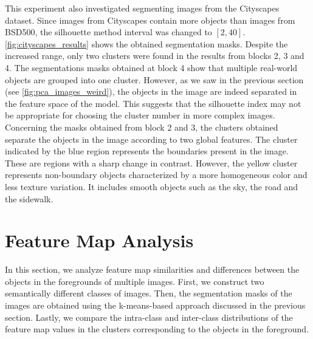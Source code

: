 This experiment also investigated segmenting images from the Cityscapes dataset. Since images from Cityscapes contain more objects than images from BSD500, the silhouette method interval was changed to $[2, 40]$. \autoref{fig:cityscapes_results} shows the obtained segmentation masks. Despite the increased range, only two clusters were found in the results from blocks 2, 3 and 4. The segmentations masks obtained at block 4 show that multiple real-world objects are grouped into one cluster. However, as we saw in the previous section (see \autoref{fig:pca_images_weird}), the objects in the image are indeed separated in the feature space of the model. This suggests that the silhouette index may not be appropriate for choosing the cluster number in more complex images. Concerning the masks obtained from block 2 and 3, the clusters obtained separate the objects in the image according to two global features. The cluster indicated by the blue region represents the boundaries present in the image. These are regions with a sharp change in contrast. However, the yellow cluster represents non-boundary objects characterized by a more homogeneous color and less texture variation. It includes smooth objects such as the sky, the road and the sidewalk.



\section{Feature Map Analysis}\label{section:further_analysis}



In this section, we analyze feature map similarities and differences between the objects in the foregrounds of multiple images. First, we construct two semantically different classes of images. Then, the segmentation masks of the images are obtained using the k-means-based approach discussed in the previous section. Lastly, we compare the intra-class and inter-class distributions of the feature map values in the clusters corresponding to the objects in the foreground. 

